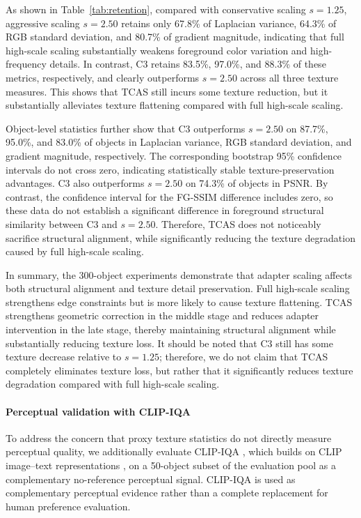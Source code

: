 \documentclass[times,twocolumn,final]{elsarticle}
\begin{document}
As shown in Table~\ref{tab:retention}, compared with conservative scaling $s = 1.25$, aggressive scaling $s = 2.50$ retains only 67.8\% of Laplacian variance, 64.3\% of RGB standard deviation, and 80.7\% of gradient magnitude, indicating that full high-scale scaling substantially weakens foreground color variation and high-frequency details. In contrast, C3 retains 83.5\%, 97.0\%, and 88.3\% of these metrics, respectively, and clearly outperforms $s = 2.50$ across all three texture measures. This shows that TCAS still incurs some texture reduction, but it substantially alleviates texture flattening compared with full high-scale scaling.

Object-level statistics further show that C3 outperforms $s = 2.50$ on 87.7\%, 95.0\%, and 83.0\% of objects in Laplacian variance, RGB standard deviation, and gradient magnitude, respectively. The corresponding bootstrap 95\% confidence intervals do not cross zero, indicating statistically stable texture-preservation advantages. C3 also outperforms $s = 2.50$ on 74.3\% of objects in PSNR. By contrast, the confidence interval for the FG-SSIM difference includes zero, so these data do not establish a significant difference in foreground structural similarity between C3 and $s = 2.50$. Therefore, TCAS does not noticeably sacrifice structural alignment, while significantly reducing the texture degradation caused by full high-scale scaling.

In summary, the 300-object experiments demonstrate that adapter scaling affects both structural alignment and texture detail preservation. Full high-scale scaling strengthens edge constraints but is more likely to cause texture flattening. TCAS strengthens geometric correction in the middle stage and reduces adapter intervention in the late stage, thereby maintaining structural alignment while substantially reducing texture loss. It should be noted that C3 still has some texture decrease relative to $s = 1.25$; therefore, we do not claim that TCAS completely eliminates texture loss, but rather that it significantly reduces texture degradation compared with full high-scale scaling.

\paragraph{Perceptual validation with CLIP-IQA}
To address the concern that proxy texture statistics do not directly measure perceptual quality, we additionally evaluate CLIP-IQA \cite{wang2023clipiqa}, which builds on CLIP image--text representations \cite{radford2021clip}, on a 50-object subset of the evaluation pool as a complementary no-reference perceptual signal. CLIP-IQA is used as complementary perceptual evidence rather than a complete replacement for human preference evaluation.
\end{document}
